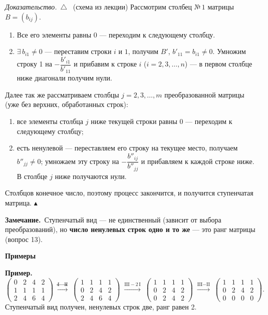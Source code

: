 \documentclass[a4paper,11pt]{article}
\newcommand{\gauss}[1]{\;\xrightarrow{\scriptstyle #1}\;}
\newcommand{\prim}{\par\smallskip\noindent\textbf{\textcolor{teoc!80!black}{Пример.}}\ }
\newcommand{\zam}{\par\smallskip\noindent\textbf{\textcolor{zamc}{Замечание.}}\ }
\newenvironment{dok}
  {\par\smallskip\noindent\textit{Доказательство.}\ $\triangle$\ \ignorespaces}
  {\unskip\nobreak\hfill$\blacktriangle$\par\smallskip}
\newcommand{\podr}[1]{\par\needspace{8\baselineskip}\medskip
  {\large\bfseries\textcolor{oprc!80!black}{#1}}\par\nopagebreak\smallskip}
\begin{document}
\begin{dok}
(схема из лекции) Рассмотрим столбец $\text{№}\,1$ матрицы $B = (b_{ij})$.
\begin{enumerate}[label=\alph*)]
  \item Все его элементы равны 0 --- переходим к следующему столбцу.
  \item $\exists\, b_{i1} \ne 0$ --- переставим строки $i$ и $1$, получим $B'$, $b'_{11} = b_{i1} \ne 0$.
        Умножим строку 1 на $-\dfrac{b'_{i1}}{b'_{11}}$ и прибавим к строке $i$ ($i = 2, 3, \dots, n$) --- в первом столбце
        ниже диагонали получим нули.
\end{enumerate}
Далее так же рассматриваем столбцы $j = 2, 3, \dots, m$ преобразованной матрицы (уже без верхних, обработанных строк):
\begin{enumerate}[label=\alph*)]
  \item все элементы столбца $j$ ниже текущей строки равны 0 --- переходим к следующему столбцу;
  \item есть ненулевой --- переставляем его строку на текущее место, получаем $b''_{jj} \ne 0$; умножаем эту строку на
        $-\dfrac{b''_{ij}}{b''_{jj}}$ и прибавляем к каждой строке ниже. В столбце $j$ ниже получаются нули.
\end{enumerate}
Столбцов конечное число, поэтому процесс закончится, и получится ступенчатая матрица.
\end{dok}

\zam Ступенчатый вид --- не единственный (зависит от выбора преобразований), но \textbf{число ненулевых строк одно и то же} ---
это ранг матрицы (вопрос 13).

\podr{Примеры}

\prim
\[
  \begin{pmatrix} 0 & 2 & 4 & 2 \\ 1 & 1 & 1 & 1 \\ 2 & 4 & 6 & 4 \end{pmatrix}
  \gauss{\text{I} \leftrightarrow \text{II}}
  \begin{pmatrix} 1 & 1 & 1 & 1 \\ 0 & 2 & 4 & 2 \\ 2 & 4 & 6 & 4 \end{pmatrix}
  \gauss{\text{III} - 2\,\text{I}}
  \begin{pmatrix} 1 & 1 & 1 & 1 \\ 0 & 2 & 4 & 2 \\ 0 & 2 & 4 & 2 \end{pmatrix}
  \gauss{\text{III} - \text{II}}
  \begin{pmatrix} 1 & 1 & 1 & 1 \\ 0 & 2 & 4 & 2 \\ 0 & 0 & 0 & 0 \end{pmatrix}.
\]
Ступенчатый вид получен, ненулевых строк две, ранг равен 2.
\end{document}
